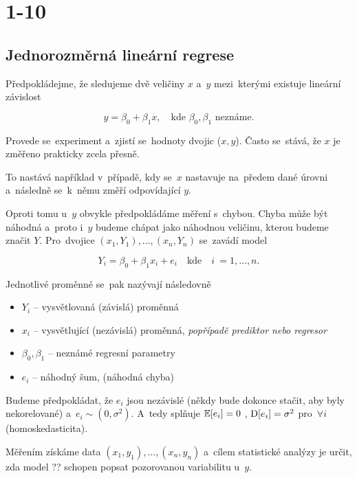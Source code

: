 \chapter{1-10}
\section{Jednorozměrná lineární regrese}
Předpokládejme, že sledujeme dvě veličiny $ x $ a~$ y $ mezi~kterými existuje lineární závislost

$$
	y = \beta_{0} + \beta_{1} x,\quad \text{kde } \beta_{0}, \beta_{1} \text{ neznáme.} 
$$

Provede se~experiment a~zjistí se~hodnoty dvojic ($ x , y $). Často se~stává, že $ x $ je změřeno prakticky zcela přesně.

\begin{remark}
 To nastává například v~případě, kdy se~$ x $ nastavuje na~předem dané úrovni a~následně se~k~němu změří odpovídající $ y $.
\end{remark}
 
Oproti tomu u~$ y $ obvykle předpokládáme měření s~chybou. Chyba může být náhodná a~proto i~$ y $ budeme chápat jako náhodnou veličinu, kterou budeme značit $ Y $. Pro~dvojice $ (x_{1}, Y_{1}), \dots ,( x_{n}, Y_{n} )$ se~zavádí model

$$
	Y_{i} = \beta_{0} + \beta_{1} x_{i} + e_{i} \quad \text{kde} \quad i~= 1, \dots ,n .
$$

Jednotlivé proměnné se~pak nazývají následovně

\begin{itemize}
  \item $ Y_{i} $ -- vysvětlovaná (závislá) proměnná
  \item $ x_{i} $ -- vysvětlující (nezávislá) proměnná, \textit{popřípadě prediktor nebo regresor}
  \item $ \beta_{0},\beta_{1} $ -- neznámé regresní parametry
  \item $ e_{i} $ -- náhodný šum, (náhodná chyba)
\end{itemize}

Budeme předpokládat, že $ e_{i} $ jsou nezávislé (někdy bude dokonce stačit, aby byly nekorelované) a~$ e_{i} \sim (0,\sigma ^{2}) $. A~tedy splňuje $ \mathbb{E} [ e_{i} ]  = 0 $ , $ \mathrm{D} [ e_{i} ] = \sigma ^{2} $ pro~$ \forall i~$ (homoskedasticita).

Měřením získáme data $ (x_{1}, y_{1}), \dots ,( x_{n}, y_{n} )$ a~cílem statistické analýzy je určit, zda model ?? schopen popsat pozorovanou variabilitu u~$ y $. 


